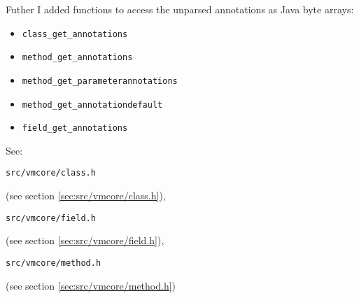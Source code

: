 \documentclass[a4paper, 10pt, titlepage]{scrartcl} %
\begin{document}
Futher I added functions to access the unparsed annotations as Java byte arrays:
\begin{itemize}
 \item \begin{scriptsize}\verb|class_get_annotations|\end{scriptsize}
 \item \begin{scriptsize}\verb|method_get_annotations|\end{scriptsize}
 \item \begin{scriptsize}\verb|method_get_parameterannotations|\end{scriptsize}
 \item \begin{scriptsize}\verb|method_get_annotationdefault|\end{scriptsize}
 \item \begin{scriptsize}\verb|field_get_annotations|\end{scriptsize}
\end{itemize}
See: \begin{scriptsize}\verb|src|\hspace{0.0pt}\verb|/|\hspace{0.0pt}\verb|vmcore|\hspace{0.0pt}\verb|/|\hspace{0.0pt}\verb|class|\hspace{0.0pt}\verb|.|\hspace{0.0pt}\verb|h|\end{scriptsize} (see section \ref{sec:src/vmcore/class.h}),
\begin{scriptsize}\verb|src|\hspace{0.0pt}\verb|/|\hspace{0.0pt}\verb|vmcore|\hspace{0.0pt}\verb|/|\hspace{0.0pt}\verb|field|\hspace{0.0pt}\verb|.|\hspace{0.0pt}\verb|h|\end{scriptsize} (see section \ref{sec:src/vmcore/field.h}),
\begin{scriptsize}\verb|src|\hspace{0.0pt}\verb|/|\hspace{0.0pt}\verb|vmcore|\hspace{0.0pt}\verb|/|\hspace{0.0pt}\verb|method|\hspace{0.0pt}\verb|.|\hspace{0.0pt}\verb|h|\end{scriptsize} (see section \ref{sec:src/vmcore/method.h})
\end{document}
